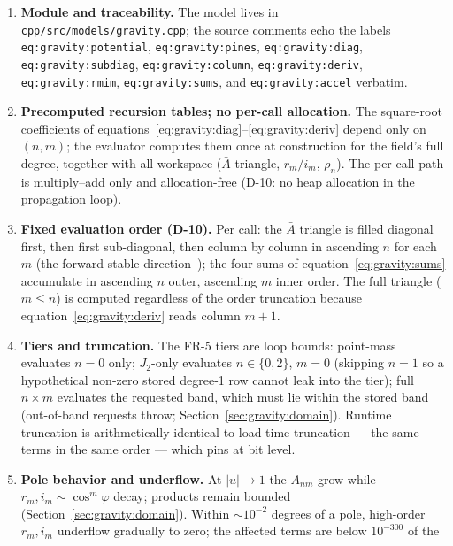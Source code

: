 \begin{enumerate}
  \item \textbf{Module and traceability.} The model lives in
    \texttt{cpp/src/models/gravity.cpp}; the source comments echo the
    labels \texttt{eq:gravity:potential}, \texttt{eq:gravity:pines},
    \texttt{eq:gravity:diag}, \texttt{eq:gravity:subdiag},
    \texttt{eq:gravity:column}, \texttt{eq:gravity:deriv},
    \texttt{eq:gravity:rmim}, \texttt{eq:gravity:sums}, and
    \texttt{eq:gravity:accel} verbatim.
  \item \textbf{Precomputed recursion tables; no per-call allocation.}
    The square-root coefficients of
    equations~\eqref{eq:gravity:diag}--\eqref{eq:gravity:deriv} depend
    only on $(n, m)$; the evaluator computes them once at construction
    for the field's full degree, together with all workspace
    ($\bar{A}$ triangle, $r_m/i_m$, $\rho_n$). The per-call path is
    multiply--add only and allocation-free (D-10: no heap allocation in
    the propagation loop).
  \item \textbf{Fixed evaluation order (D-10).} Per call: the
    $\bar{A}$ triangle is filled diagonal first, then first
    sub-diagonal, then column by column in ascending $n$ for each $m$
    (the forward-stable direction~\cite{lundberg1988}); the four sums of
    equation~\eqref{eq:gravity:sums} accumulate in ascending $n$ outer,
    ascending $m$ inner order. The full triangle ($m \leq n$) is
    computed regardless of the order truncation because
    equation~\eqref{eq:gravity:deriv} reads column $m + 1$.
  \item \textbf{Tiers and truncation.} The FR-5 tiers are loop bounds:
    point-mass evaluates $n = 0$ only; $J_2$-only evaluates $n \in
    \{0, 2\}$, $m = 0$ (skipping $n = 1$ so a hypothetical non-zero
    stored degree-1 row cannot leak into the tier); full $n \times m$
    evaluates the requested band, which must lie within the stored band
    (out-of-band requests throw; Section~\ref{sec:gravity:domain}).
    Runtime truncation is arithmetically identical to load-time
    truncation --- the same terms in the same order --- which
     pins at bit level.
  \item \textbf{Pole behavior and underflow.} At $|u| \to 1$ the
    $\bar{A}_{nm}$ grow while $r_m, i_m \sim \cos^m\varphi$ decay;
    products remain bounded (Section~\ref{sec:gravity:domain}). Within
    $\sim 10^{-2}$ degrees of a pole, high-order $r_m, i_m$ underflow
    gradually to zero; the affected terms are below $10^{-300}$ of the

\end{enumerate}
